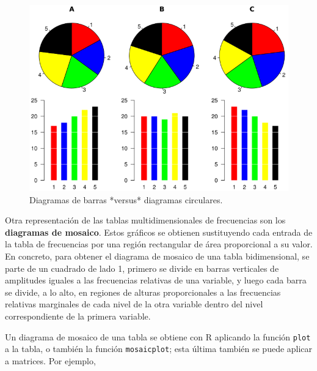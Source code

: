 \documentclass[]{book}
\theoremstyle{definition}
\theoremstyle{definition}
\theoremstyle{definition}
\theoremstyle{remark}
\begin{document}
\begin{figure}

{\centering \includegraphics{AprendeR-Parte-I_files/figure-html/wikipc} 

}

\caption{Diagramas de barras *versus* diagramas circulares.}\label{fig:wiki}
\end{figure}

Otra representación de las tablas multidimensionales de frecuencias son los \textbf{diagramas de mosaico}. Estos gráficos se obtienen sustituyendo cada entrada de la tabla de frecuencias por una región rectangular de área proporcional a su valor. En concreto, para obtener el diagrama de mosaico de una tabla bidimensional, se parte de un cuadrado de lado 1,
primero se divide en barras verticales de amplitudes iguales a las frecuencias relativas de una variable, y luego cada barra se divide, a lo alto, en regiones de alturas proporcionales a las frecuencias relativas marginales de cada nivel de la otra variable dentro del nivel correspondiente de la primera variable.

Un diagrama de mosaico de una tabla se obtiene con R aplicando la función \texttt{plot} a la tabla, o también la función \texttt{mosaicplot}; esta última también se puede aplicar a matrices. Por ejemplo,
\end{document}
